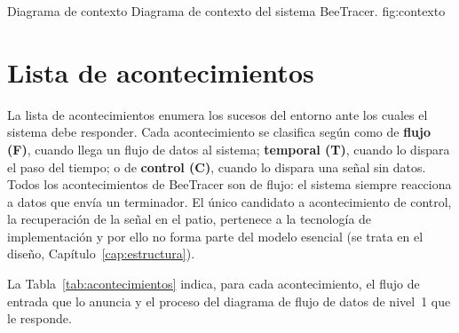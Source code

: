     {Diagrama de contexto}
    {Diagrama de contexto del sistema BeeTracer.}
    {fig:contexto}

\section{Lista de acontecimientos}
\label{sec:acontecimientos}

La lista de acontecimientos enumera los sucesos del entorno ante los cuales el sistema debe
responder. Cada acontecimiento se clasifica según \textcite{yourdon1989} como de
\textbf{flujo (F)}, cuando llega un flujo de datos al sistema; \textbf{temporal (T)}, cuando
lo dispara el paso del tiempo; o de \textbf{control (C)}, cuando lo dispara una señal sin
datos. Todos los acontecimientos de BeeTracer son de flujo: el sistema siempre reacciona a
datos que envía un terminador. El único candidato a acontecimiento de control, la
recuperación de la señal en el patio, pertenece a la tecnología de implementación y por ello
no forma parte del modelo esencial (se trata en el diseño, Capítulo~\ref{cap:estructura}).

La Tabla~\ref{tab:acontecimientos} indica, para cada acontecimiento, el flujo de entrada que lo
anuncia y el proceso del diagrama de flujo de datos de nivel~1 que le responde.

